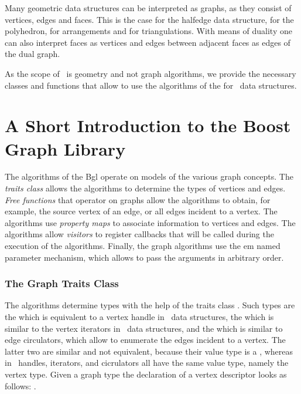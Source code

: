 

Many geometric data structures can be interpreted as graphs, as they consist of
vertices, edges and faces. This is the case for the halfedge data structure,
for the polyhedron, for arrangements and for triangulations. With means of
duality one can also interpret faces as vertices and edges between adjacent
faces as edges of the dual graph. 


As the scope of \cgal\ is geometry and not graph algorithms, we
provide the necessary classes and functions that allow to use the
algorithms of the  for \cgal\ data structures.

\section{A Short Introduction to the Boost Graph Library}

The algorithms of the {\sc Bgl} operate on models of the various graph concepts. 
The {\em traits class}  allows the algorithms to determine the types of vertices and edges. 
{\em Free functions} that operator on graphs allow the algorithms to obtain,
for example, the source vertex of an edge, or  all edges incident to a vertex. The algorithms 
use {\em property maps} to associate information to vertices and edges. 
The algorithms allow {\em visitors} to register callbacks that will be called
during the execution of the algorithms. Finally, the graph algorithms use
the {em named parameter} mechanism, which allows to pass the  arguments in
arbitrary order.

\subsubsection*{The Graph Traits Class}

The algorithms determine types with the help of the traits class
.  Such types are the 
which is equivalent to a vertex handle in \cgal\ data structures, the
 which is similar to the vertex iterators in
\cgal\ data structures, and the  which is
similar to edge circulators, which allow to enumerate the edges
incident to a vertex. The latter two are similar and not equivalent,
because their value type is a , whereas in
\cgal\ handles, iterators, and cicrulators all have the same value
type, namely the vertex type.  Given a graph type  the
declaration of a vertex descriptor looks as follows:
.

